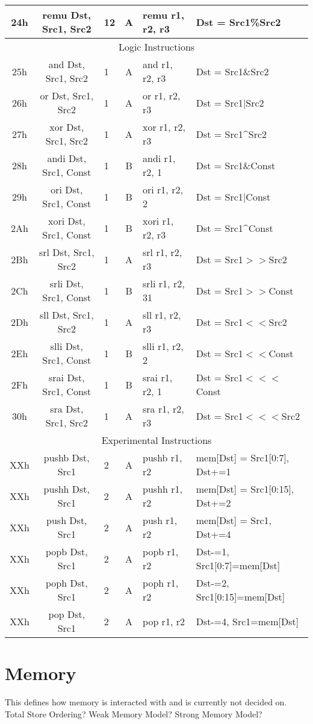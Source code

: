 \documentclass[]{article}
\begin{document}
\begin{longtable}{|c|c|l|c|l|p{5cm}|}
	\hline
	24h & remu Dst, Src1, Src2 & 12 & A & remu r1, r2, r3 & Dst = Src1\%Src2 \\
	\hline
	\multicolumn{6}{|c|}{Logic Instructions} \\
	\hline
	25h & and Dst, Src1, Src2 & 1 & A & and r1, r2, r3 & Dst = Src1\&Src2 \\
	\hline
	26h & or Dst, Src1, Src2 & 1 & A & or r1, r2, r3 & Dst = Src1$|$Src2 \\
	\hline
	27h & xor Dst, Src1, Src2 & 1 & A & xor r1, r2, r3 & Dst = Src1\string^Src2 \\
	\hline
	28h & andi Dst, Src1, Const & 1 & B & andi r1, r2, 1 & Dst = Src1\&Const \\
	\hline
	29h & ori Dst, Src1, Const & 1 & B & ori r1, r2, 2 & Dst = Src1$|$Const \\
	\hline
	2Ah & xori Dst, Src1, Const & 1 & B & xori r1, r2, r3 & Dst = Src1\string^Const \\
	\hline
	2Bh & srl Dst, Src1, Src2 & 1 & A & srl r1, r2, r3 & Dst = Src1$>>$Src2 \\
	\hline
	2Ch & srli Dst, Src1, Const & 1 & B & srli r1, r2, 31 & Dst = Src1$>>$Const \\
	\hline
	2Dh & sll Dst, Src1, Src2 & 1 & A & sll r1, r2, r3 & Dst = Src1$<<$Src2 \\
	\hline
	2Eh & slli Dst, Src1, Const & 1 & B & slli r1, r2, 2 & Dst = Src1$<<$Const \\
	\hline
	2Fh & srai Dst, Src1, Const & 1 & B & srai r1, r2, 1 & Dst = Src1$<<<$Const \\
	\hline
	30h & sra Dst, Src1, Src2 & 1 & A & sra r1, r2, r3 & Dst = Src1$<<<$Src2 \\
	\hline
	\multicolumn{6}{|c|}{Experimental Instructions} \\
	\hline
	XXh & pushb Dst, Src1 & 2 & A & pushb r1, r2 & mem[Dst] = Src1[0:7], Dst+=1 \\
	\hline
	XXh & pushh Dst, Src1 & 2 & A & pushh r1, r2 & mem[Dst] = Src1[0:15], Dst+=2 \\
	\hline
	XXh & push Dst, Src1 & 2 & A & push r1, r2 & mem[Dst] = Src1, Dst+=4 \\
	\hline
	XXh & popb Dst, Src1 & 2 & A & popb r1, r2 & Dst-=1, Src1[0:7]=mem[Dst] \\
	\hline
	XXh & poph Dst, Src1 & 2 & A & poph r1, r2 & Dst-=2, Src1[0:15]=mem[Dst] \\
	\hline
	XXh & pop Dst, Src1 & 2 & A & pop r1, r2 & Dst-=4, Src1=mem[Dst] \\
	\hline
\end{longtable}

\section{Memory}
This defines how memory is interacted with and is currently not decided on.
Total Store Ordering? Weak Memory Model? Strong Memory Model?
\end{document}
